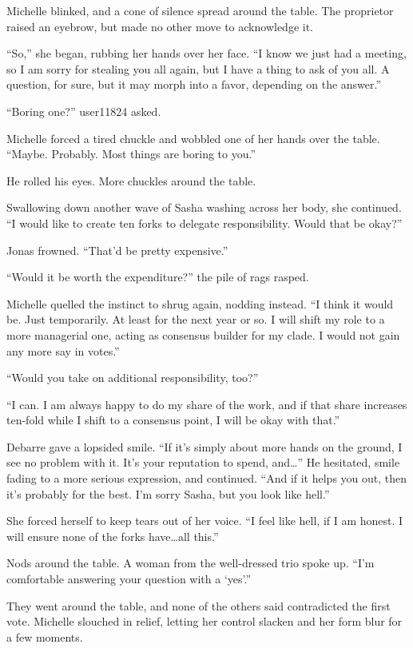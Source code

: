Michelle blinked, and a cone of silence spread around the table. The proprietor raised an eyebrow, but made no other move to acknowledge it.

``So,'' she began, rubbing her hands over her face. ``I know we just had a meeting, so I am sorry for stealing you all again, but I have a thing to ask of you all. A question, for sure, but it may morph into a favor, depending on the answer.''

``Boring one?'' user11824 asked.

Michelle forced a tired chuckle and wobbled one of her hands over the table. ``Maybe. Probably. Most things are boring to you.''

He rolled his eyes. More chuckles around the table.

Swallowing down another wave of Sasha washing across her body, she continued. ``I would like to create ten forks to delegate responsibility. Would that be okay?''

Jonas frowned. ``That'd be pretty expensive.''

``Would it be worth the expenditure?'' the pile of rags rasped.

Michelle quelled the instinct to shrug again, nodding instead. ``I think it would be. Just temporarily. At least for the next year or so. I will shift my role to a more managerial one, acting as consensus builder for my clade. I would not gain any more say in votes.''

``Would you take on additional responsibility, too?''

``I can. I am always happy to do my share of the work, and if that share increases ten-fold while I shift to a consensus point, I will be okay with that.''

Debarre gave a lopsided smile. ``If it's simply about more hands on the ground, I see no problem with it. It's your reputation to spend, and\ldots{}'' He hesitated, smile fading to a more serious expression, and continued. ``And if it helps you out, then it's probably for the best. I'm sorry Sasha, but you look like hell.''

She forced herself to keep tears out of her voice. ``I feel like hell, if I am honest. I will ensure none of the forks have\ldots all this.''

Nods around the table. A woman from the well-dressed trio spoke up. ``I'm comfortable answering your question with a `yes'.''

They went around the table, and none of the others said contradicted the first vote. Michelle slouched in relief, letting her control slacken and her form blur for a few moments.

